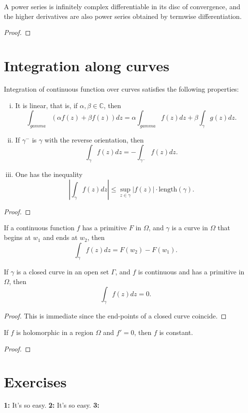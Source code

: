 \begin{corollary}
    A power series is infinitely complex differentiable in its disc of convergence, and the higher
    derivatives are also power series obtained by termwise differentiation.
\end{corollary}
\begin{proof}
\end{proof}






\section{Integration along curves}

\begin{proposition}
    Integration of continuous function over curves satisfies the following properties:
    \begin{enumerate}[(i)]
        \item It is linear, that is, if $\alpha,\beta\in\mathbb{C}$, then
        \[
            \int_{gamma}(\alpha f(z)+\beta f(z))dz=
            \alpha\int_{gamma}f(z)dz+\beta\int_{\gamma}g(z)dz.
        \]
        \item If $\gamma^-$ is $\gamma$ with the reverse orientation, then
        \[
            \int_{\gamma}f(z)dz=-\int_{\gamma^-}f(z)dz.
        \]
        \item One has the inequality
        \[
            |\int_{\gamma}f(z)dz|\le \sup_{z\in\gamma}|f(z)|\cdot
            \text{length}(\gamma).
        \]
        \end{enumerate}
\end{proposition}
\begin{proof}
\end{proof}

\begin{theorem}
    If a continuous function $f$ has a primitive $F$ in $\Omega$, and
    $\gamma$ is a curve in $\Omega$ that begins at $w_1$ and ends at $w_2$,
    then
    \[
        \int_{\gamma}f(z)dz=F(w_2)-F(w_1).
    \]
\end{theorem}

\begin{corollary}
    If $\gamma$ is a closed curve in an open set $\Gamma$, and $f$ is continuous
    and has a primitive in $\Omega$, then
    \[
        \int_{\gamma}f(z)dz=0.
    \]
\end{corollary}
\begin{proof}
    This is immediate since the end-points of a closed curve coincide.
\end{proof}

\begin{corollary}
    If $f$ is holomorphic in a region $\Omega$ and $f'=0$, then $f$ is constant.
\end{corollary}
\begin{proof}

\end{proof}

\section{Exercises}

\textbf{1:} It's so easy.\newline
\textbf{2:} It's so easy.\newline
\textbf{3:} 


